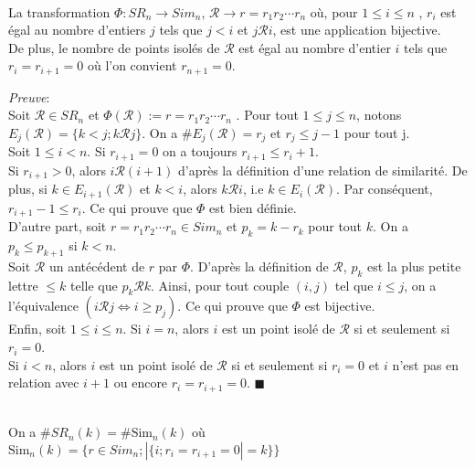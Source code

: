 \begin{proposition} \label{Phi_bijection} \text{ }\\
	La transformation $\Phi: SR_{n} \rightarrow Sim_{n}$, $\mathcal{R} \rightarrow r = r_{1}r_{2}\cdots r_{n}$ où, pour $1\leq i \leq n$ , $r_{i}$ est égal au nombre d'entiers $j$ tels que $j<i$ et $j\mathcal{R}i$, est une application bijective.\\ De plus, le nombre de points isolés de $\mathcal{R}$ est égal au nombre d'entier $i$ tels que $r_{i}=r_{i+1}=0$ où l'on convient $r_{n+1}=0$.
\end{proposition}
\textit{Preuve}:\\
Soit $\mathcal{R} \in SR_{n}$ et $\Phi(\mathcal{R}):= r = r_{1}r_{2}\cdots r_{n}$ . Pour tout $1\leq j \leq n$, notons $E_{j}(\mathcal{R})=\{k<j; k \mathcal{R} j \}$. On a $\# E_{j}(\mathcal{R})=r_{j}$ et $r_{j}\leq j-1$ pour tout j.\\ Soit $1\leq i < n$. Si $r_{i+1}=0$ on a toujours $r_{i+1}\leq r_{i}+1$.\\
Si $r_{i+1}>0$, alors $i\mathcal{R}(i+1)$ d'après la définition d'une relation de similarité. De plus, si $k\in E_{i+1}(\mathcal{R})$ et $k<i$, alors $k\mathcal{R}i$, i.e $k\in E_{i}(\mathcal{R})$. Par conséquent, $r_{i+1}-1 \leq r_{i}$. Ce qui prouve que $\Phi$ est bien définie.\vspace{5pt}\\
D'autre part, soit $r=r_{1}r_{2}\cdots r_{n}\in Sim_{n}$ et $p_{k}=k-r_{k}$ pour tout $k$. On a $p_{k}\leq p_{k+1}$ si $k<n$.\\
Soit $\mathcal{R}$ un antécédent de $r$ par $\Phi$. D'après la définition de $\mathcal{R}$, $p_{k}$ est la plus petite lettre $\leq k$ telle que $p_{k}\mathcal{R}k$. Ainsi, pour tout couple $(i, j)$ tel que $i\leq j$, on a l'équivalence $(i\mathcal{R}j \iff i \geq p_{j})$. Ce qui prouve que $\Phi$ est bijective.\vspace{10pt}\\
Enfin, soit $1\leq i \leq n$. Si $i=n$, alors $i$ est un point isolé de $\mathcal{R}$ si et seulement si $r_{i}=0$.\\
Si $i<n$, alors $i$ est un point isolé de $\mathcal{R}$ si et seulement si $r_{i}=0$ et $i$ n'est pas en relation avec $i+1$ ou encore $r_{i}=r_{i+1}=0$. $\blacksquare$

\begin{corollaire} \label{sr_eq_sim} \text{ }\\
	On a $\# SR_{n}(k) = \#\text{Sim}_{n}(k)$ où $\text{Sim}_{n}(k)=\{r\in Sim_{n}; |\{i; r_{i}=r_{i+1}=0|=k\} \}$
\end{corollaire}

